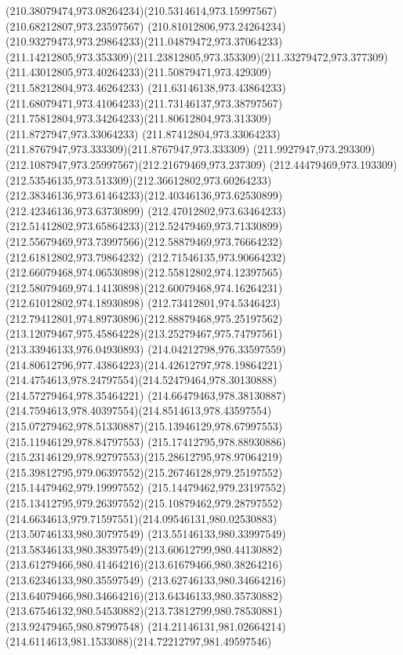 {{		\curveto(210.38079474,973.08264234)(210.5314614,973.15997567)(210.68212807,973.23597567)
		\curveto(210.81012806,973.24264234)(210.93279473,973.29864233)(211.04879472,973.37064233)
		\curveto(211.14212805,973.353309)(211.23812805,973.353309)(211.33279472,973.377309)
		\curveto(211.43012805,973.40264233)(211.50879471,973.429309)(211.58212804,973.46264233)
		\curveto(211.63146138,973.43864233)(211.68079471,973.41064233)(211.73146137,973.38797567)
		\curveto(211.75812804,973.34264233)(211.80612804,973.313309)(211.8727947,973.33064233)
		\curveto(211.87412804,973.33064233)(211.8767947,973.333309)(211.8767947,973.333309)
		\curveto(211.9927947,973.293309)(212.1087947,973.25997567)(212.21679469,973.237309)
		\curveto(212.44479469,973.193309)(212.53546135,973.513309)(212.36612802,973.60264233)
		\curveto(212.38346136,973.61464233)(212.40346136,973.62530899)(212.42346136,973.63730899)
		\curveto(212.47012802,973.63464233)(212.51412802,973.65864233)(212.52479469,973.71330899)
		\curveto(212.55679469,973.73997566)(212.58879469,973.76664232)(212.61812802,973.79864232)
		\curveto(212.71546135,973.90664232)(212.66079468,974.06530898)(212.55812802,974.12397565)
		\curveto(212.58079469,974.14130898)(212.60079468,974.16264231)(212.61012802,974.18930898)
		\curveto(212.73412801,974.5346423)(212.79412801,974.89730896)(212.88879468,975.25197562)
		\curveto(213.12079467,975.45864228)(213.25279467,975.74797561)(213.33946133,976.04930893)
		\curveto(214.04212798,976.33597559)(214.80612796,977.43864223)(214.42612797,978.19864221)
		\curveto(214.4754613,978.24797554)(214.52479464,978.30130888)(214.57279464,978.35464221)
		\curveto(214.66479463,978.38130887)(214.7594613,978.40397554)(214.8514613,978.43597554)
		\curveto(215.07279462,978.51330887)(215.13946129,978.67997553)(215.11946129,978.84797553)
		\curveto(215.17412795,978.88930886)(215.23146129,978.92797553)(215.28612795,978.97064219)
		\curveto(215.39812795,979.06397552)(215.26746128,979.25197552)(215.14479462,979.19997552)
		\curveto(215.14479462,979.23197552)(215.13412795,979.26397552)(215.10879462,979.28797552)
		\curveto(214.6634613,979.71597551)(214.09546131,980.02530883)(213.50746133,980.30797549)
		\curveto(213.55146133,980.33997549)(213.58346133,980.38397549)(213.60612799,980.44130882)
		\curveto(213.61279466,980.41464216)(213.61679466,980.38264216)(213.62346133,980.35597549)
		\curveto(213.62746133,980.34664216)(213.64079466,980.34664216)(213.64346133,980.35730882)
		\curveto(213.67546132,980.54530882)(213.73812799,980.78530881)(213.92479465,980.87997548)
		\curveto(214.21146131,981.02664214)(214.6114613,981.1533088)(214.72212797,981.49597546)
}}
